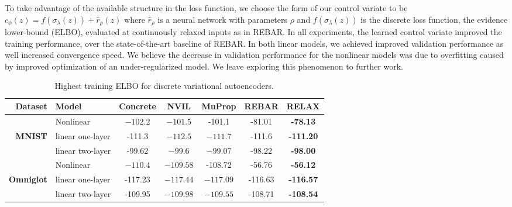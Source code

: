\documentclass{article}
\newcommand{\E}{\mathbb{E}}
\newcommand{\PT}{\frac{\partial}{\partial \theta}}
\newcommand{\PP}[1]{\frac{\partial}{\partial #1}}
\begin{document}
To take advantage of the available structure in the loss function, we choose the form of our control variate to be $c_\phi(z) = f(\sigma_\lambda(z))+  \hat{r}_\rho(z)$ where $\hat{r}_\rho$ is a neural network with parameters $\rho$ and $f(\sigma_\lambda(z))$ is the discrete loss function, the evidence lower-bound (ELBO), evaluated at continuously relaxed inputs as in REBAR.  
%
In all experiments, the learned control variate improved the training performance, over the state-of-the-art baseline of REBAR. In both linear models, we achieved improved validation performance as well increased convergence speed. We believe the decrease in validation performance for the nonlinear models was due to overfitting caused by improved optimization of an under-regularized model. We leave exploring this phenomenon to further work. 

\begin{table}[h]
\centering
\begin{tabular}{r l | c c c c c} 
Dataset & Model & Concrete & NVIL & MuProp  & REBAR & RELAX\\\midrule 
               & Nonlinear & $-102.2$ & $-101.5$ & -101.1  &  -81.01 &  \textbf{-78.13} \\
\textbf{MNIST} & linear one-layer  &-111.3 & $-112.5$ & $-111.7$  & -111.6 & \textbf{-111.20} \\ 
               & linear two-layer  &-99.62 & $-99.6$ & $-99.07$   & -98.22 & \textbf{-98.00} \\
\midrule
               & Nonlinear  & $-110.4$  & $-109.58$ & -108.72  & -56.76 & \textbf{-56.12} \\
\textbf{Omniglot} & linear one-layer &-117.23 & $-117.44$ & $-117.09$   & -116.63 & \textbf{-116.57} \\ 
                  & linear two-layer &-109.95 & $-109.98$ & $-109.55$  & -108.71 & \textbf{-108.54}
\end{tabular}
\caption{Highest training ELBO for discrete variational autoencoders.}
\label{tab:vae tr}
\end{table}




\end{document}
